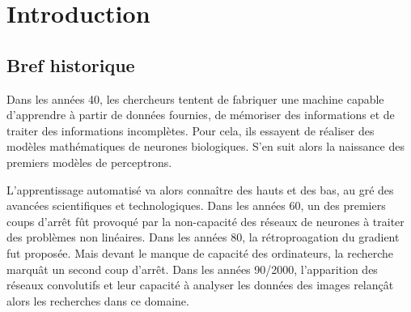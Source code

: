 \section{Introduction}

\subsection{Bref historique}
Dans les années 40, les chercheurs tentent de fabriquer une machine capable d'apprendre à partir de données fournies, de mémoriser des informations et de traiter des informations incomplètes. Pour cela, ils essayent de réaliser des modèles mathématiques de neurones biologiques. S'en suit alors la naissance des premiers modèles de perceptrons. 

L'apprentissage automatisé va alors connaître des hauts et des bas, au gré des avancées scientifiques et technologiques. Dans les années 60, un des premiers coups d'arrêt fût provoqué par la non-capacité des réseaux de neurones à traiter des problèmes non linéaires. Dans les années 80, la rétroproagation du gradient fut proposée. Mais devant le manque de capacité des ordinateurs, la recherche marquât un second coup d'arrêt. Dans les années 90/2000, l'apparition des réseaux convolutifs et leur capacité à analyser les données des images relançât alors les recherches dans ce domaine.

